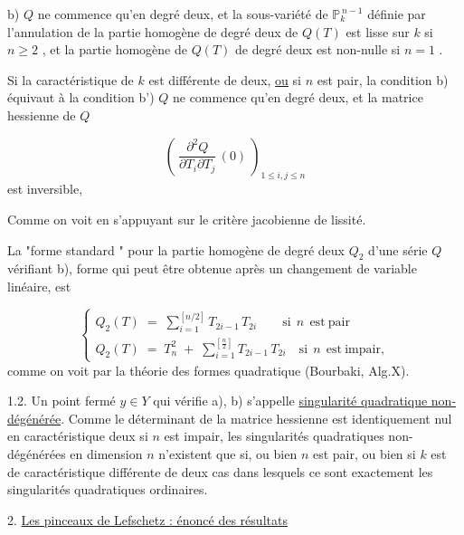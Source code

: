 b) $Q$ ne commence qu'en degré deux, et la sous-variété de $\mathbb{P}^{\,n-1}_k$ définie par l'annulation de la partie homogène de degré deux de $Q(T)$ est lisse sur $k$ si $n \geq 2$ , et la partie homogène de $Q(T)$ de degré deux est non-nulle si $n = 1$ .

Si la caractéristique de $k$ est différente de deux, \underline{ou} si $n$ est pair, la condition b) équivaut à la condition
b') $Q$ ne commence qu'en degré deux, et la matrice hessienne de $Q$

\begin{equation*}
\left(\ \frac{\partial^2 Q}{\partial T_i \partial T_j}\,(0)\ \right)_{1 \leq i,j \leq n}
\end{equation*}
est inversible,

Comme on voit en s'appuyant sur le critère jacobienne de lissité.

La  "forme standard "  pour la partie homogène de degré deux $Q_2$ d'une série $Q$ vérifiant b), forme qui peut être obtenue après un changement de variable linéaire, est

\begin{equation}\tag{1.1.1}
\left\{
\begin{array}{l}
Q_2(T) \;=\; \displaystyle\sum_{i=1}^{[n/2]} T_{2i-1}\, T_{2i} \qquad \mathrm{si}\ \ n\ \ \mathrm{est\ pair} \\[4ex]
Q_2(T) \;=\; T_n^2 \;+\; \displaystyle\sum_{i=1}^{\left[\frac{n}{2}\right]} T_{2i-1}\, T_{2i} \quad \mathrm{si}\ \ n\ \ \mathrm{est\ impair,}
\end{array}
\right.
\end{equation}
comme on voit par la théorie des formes quadratique (Bourbaki, Alg.X).

1.2.    Un point fermé $y \in Y$ qui vérifie a), b) s'appelle \underline{singularité quadratique non-dégénérée}. Comme le déterminant de la matrice hessienne est identiquement nul en caractéristique deux si $n$ est impair, les singularités quadratiques non-dégénérées en dimension $n$ n'existent que si, ou bien $n$ est pair, ou bien si $k$ est de caractéristique différente de deux cas dans lesquels ce sont exactement les singularités quadratiques ordinaires.




2. \underline{Les pinceaux de Lefschetz : énoncé des résultats}

